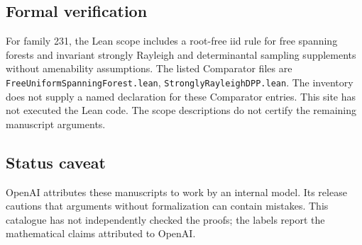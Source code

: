 \documentclass[11pt]{article}
\begin{document}
\subsection{Formal verification}
For family 231, the Lean scope includes a root-free iid rule for free spanning forests and invariant strongly Rayleigh and determinantal sampling supplements without amenability assumptions. The listed Comparator files are \texttt{FreeUniformSpanningForest.lean}, \texttt{StronglyRayleighDPP.lean}. The inventory does not supply a named declaration for these Comparator entries. This site has not executed the Lean code. The scope descriptions do not certify the remaining manuscript arguments.

\subsection{Status caveat}
OpenAI attributes these manuscripts to work by an internal model. Its release cautions that arguments without formalization can contain mistakes. This catalogue has not independently checked the proofs; the labels report the mathematical claims attributed to OpenAI.
\end{document}
